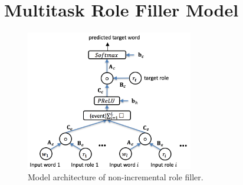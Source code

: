 \documentclass[a4paper]{article}
\begin{document}
\newpage
\section{Multitask Role Filler Model} \label{sec:mtrf}


\begin{figure}[t]
\centering
\includegraphics[width=0.65\textwidth]{NNRF.png}
\caption{\label{fig:NNRF} Model architecture of non-incremental role filler.}
\end{figure}
\end{document}
